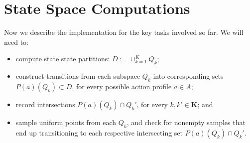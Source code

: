 \documentclass[a4paper,10pt,english]{sphinxmanual}
\begin{document}
\begin{DUlineblock}{0em}
\item[] 
\item[] 
\item[] 
\item[] 
\item[] 
\end{DUlineblock}


\chapter{State Space Computations}
\label{compute_statespace::doc}\label{compute_statespace:state-space-computations}
Now we describe the implementation for the key tasks involved so far. We will need to:
\begin{itemize}
\item {} 
compute state state partitions: $D := \cup_{k=1}^{K}Q_k$;

\item {} 
construct transitions from each subspace $Q_k$ into corresponding sets
$P(a)(Q_k) \subset D$, for every possible action profile $a \in A$;

\item {} 
record intersections $P(a)(Q_k) \cap Q_k'$, for every $k,k' \in \mathbf{K}$; and

\item {} 
sample uniform points from each $Q_k$, and check for nonempty samples that end up transitioning to each respective intersecting set $P(a)(Q_k) \cap Q_k'$.

\end{itemize}
\end{document}
